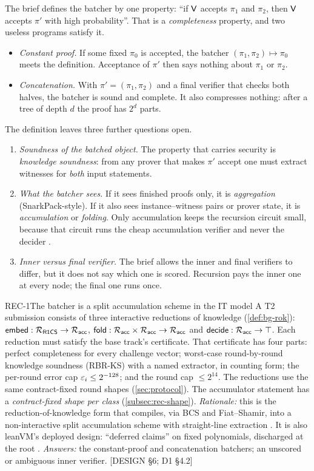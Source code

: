 The brief defines the batcher by one property: \enquote{if $\mathsf{V}$ accepts $\pi_1$ and $\pi_2$, then
$\mathsf{V}$ accepts $\pi'$ with high probability}. That is a \emph{completeness} property, and two useless
programs satisfy it.
\begin{itemize}[nosep]
\item \emph{Constant proof.} If some fixed $\pi_0$ is accepted, the batcher $(\pi_1,\pi_2)\mapsto\pi_0$
  meets the definition. Acceptance of $\pi'$ then says nothing about $\pi_1$ or $\pi_2$.
\item \emph{Concatenation.} With $\pi'=(\pi_1,\pi_2)$ and a final verifier that checks both halves,
  the batcher is sound and complete. It also compresses nothing: after a tree of depth $d$ the proof
  has $2^d$ parts.
\end{itemize}
The definition leaves three further questions open.
\begin{enumerate}[nosep,label=(\roman*)]
\item \emph{Soundness of the batched object.} The property that carries security is \emph{knowledge
  soundness}: from any prover that makes $\pi'$ accept one must extract witnesses for \emph{both}
  input statements.
\item \emph{What the batcher sees.} If it sees finished proofs only, it is \emph{aggregation}
  (SnarkPack-style). If it also sees instance--witness pairs or prover state, it is
  \emph{accumulation} or \emph{folding}. Only accumulation keeps the recursion circuit small,
  because that circuit runs the cheap accumulation verifier and never the decider
  \cite{BCLMS21,KST22-Nova}.
\item \emph{Inner versus final verifier.} The brief allows the inner and final verifiers to differ,
  but it does not say which one is scored. Recursion pays the inner one at every node; the final
  one runs once.
\end{enumerate}

\begin{decision}{REC-1}{The batcher is a split accumulation scheme in the IT model}
A T2 submission consists of three interactive reductions of knowledge
(\cref{def:bg-rok}): $\mathsf{embed}:\mathcal{R}_{\mathsf{R1CS}}\to\mathcal{R}_{\mathsf{acc}}$, $\mathsf{fold}:\mathcal{R}_{\mathsf{acc}}\times\mathcal{R}_{\mathsf{acc}}\to\mathcal{R}_{\mathsf{acc}}$ and
$\mathsf{decide}:\mathcal{R}_{\mathsf{acc}}\to\top$. Each reduction must satisfy the base track's certificate. That
certificate has four parts: perfect completeness for every challenge vector; worst-case round-by-round
knowledge soundness (RBR-KS) with a named extractor, in counting form; the per-round error cap
$\varepsilon_i\le2^{-128}$; and the round cap $\le2^{14}$. The reductions use the same contract-fixed
round shapes (\cref{sec:protocol}). The accumulator statement has a \emph{contract-fixed shape per
class} (\cref{subsec:rec-shape}). \emph{Rationale:} this is the reduction-of-knowledge form that
compiles, via BCS and Fiat--Shamir, into a non-interactive split accumulation scheme with
straight-line extraction \cite[Thms.~B.4 and 10.3]{BCFW25-WARP}. It is also leanVM's deployed design:
\enquote{deferred claims} on fixed polynomials, discharged at the root \cite{leanVM}. \emph{Answers:}
the constant-proof and concatenation batchers; an unscored or ambiguous inner verifier.
[DESIGN §6; D1 §4.2]
\end{decision}

